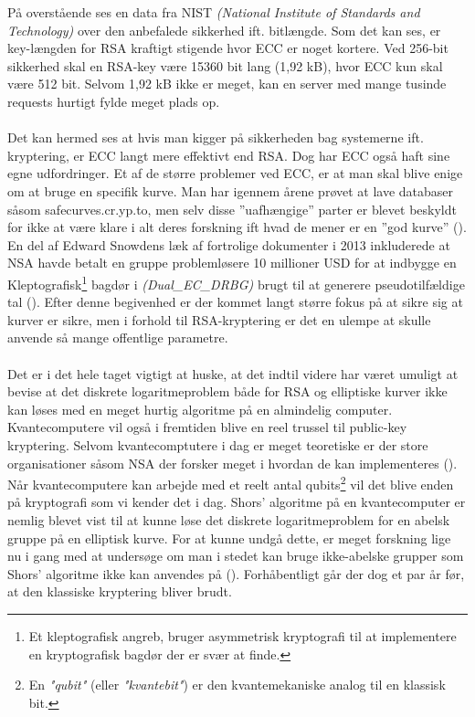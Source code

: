 \FloatBarrier
På overstående  ses en data fra NIST \textit{(National Institute of Standards and Technology)} over den anbefalede sikkerhed ift. bitlængde. Som det kan ses, er key-længden for RSA kraftigt stigende hvor ECC er noget kortere. Ved 256-bit sikkerhed skal en RSA-key være 15360 bit lang (1,92 kB), hvor ECC kun skal være 512 bit. Selvom 1,92 kB ikke er meget, kan en server med mange tusinde requests hurtigt fylde meget plads op. 
\\\\
Det kan hermed ses at hvis man kigger på sikkerheden bag systemerne ift. kryptering, er ECC langt mere effektivt end RSA. Dog har ECC også haft sine egne udfordringer. Et af de større problemer ved ECC, er at man skal blive enige om at bruge en specifik kurve. Man har igennem årene prøvet at lave databaser såsom safecurves.cr.yp.to, men selv disse ”uafhængige” parter er blevet beskyldt for ikke at være klare i alt deres forskning ift hvad de mener er en ”god kurve” (\cite{satoshinichi2020}). En del af Edward Snowdens læk af fortrolige dokumenter i 2013 inkluderede at NSA havde betalt en gruppe problemløsere 10 millioner USD for at indbygge en Kleptografisk\footnote{Et kleptografisk angreb, bruger asymmetrisk kryptografi til at implementere en kryptografisk bagdør der er svær at finde.\cite{patrickvacek2013}} bagdør i \textit{(Dual\_EC\_DRBG)} brugt til at generere pseudotilfældige tal (\cite{josephmenn2013}). Efter denne begivenhed er der kommet langt større fokus på at sikre sig at kurver er sikre, men i forhold til RSA-kryptering er det en ulempe at skulle anvende så mange offentlige parametre. \\\\
Det er i det hele taget vigtigt at huske, at det indtil videre har været umuligt at bevise at det diskrete logaritmeproblem både for RSA og elliptiske kurver ikke kan løses med en meget hurtig algoritme på en almindelig computer. Kvantecomputere vil også i fremtiden blive en reel trussel til public-key kryptering. Selvom kvantecomptutere i dag er meget teoretiske er der store organisationer såsom NSA der forsker meget i hvordan de kan implementeres (\cite{nsa2022}). Når kvantecomputere kan arbejde med et reelt antal qubits\footnote{En \textit{"qubit"} (eller \textit{"kvantebit"}) er den kvantemekaniske analog til en klassisk bit.} vil det blive enden på kryptografi som vi kender det i dag. Shors’ algoritme på en kvantecomputer er nemlig blevet vist til at kunne løse det diskrete logaritmeproblem for en abelsk gruppe på en elliptisk kurve. For at kunne undgå dette, er meget forskning lige nu i gang med at undersøge om man i stedet kan bruge ikke-abelske grupper som Shors’ algoritme ikke kan anvendes på (\cite{jeremywohlwend2022}). Forhåbentligt går der dog et par år før, at den klassiske kryptering bliver brudt.
